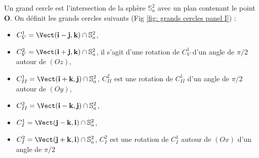 Un grand cercle est l'intersection de la sphère $\mathbb{S}_a^2$ avec un plan contenant le point $\mathbf{O}$. On définit les grands cercles suivants (Fig \ref{fig: grands cercles panel I}) :

\begin{itemize}
\item $C_V^1 = \Vect(\mathbf{i}-\mathbf{j}, \mathbf{k}) \cap \mathbb{S}_a^2$,
\item $C_V^2 = \Vect(\mathbf{i}+\mathbf{j}, \mathbf{k}) \cap \mathbb{S}_a^2$, il s'agit d'une rotation de $C_V^1$ d'un angle de $\pi/2$ autour de $(Oz)$,
\item $C_{II}^1 = \Vect(\mathbf{i}+\mathbf{k}, \mathbf{j}) \cap \mathbb{S}_a^2$, $C_{II}^2$ est une rotation de $C_{II}^1$ d'un angle de $\pi/2$ autour de $(Oy)$,
\item $C_{II}^2 = \Vect(\mathbf{i}-\mathbf{k}, \mathbf{j}) \cap \mathbb{S}_a^2$,
\item $C_I^1=\Vect(\mathbf{j}-\mathbf{k},\mathbf{i}) \cap \mathbb{S}_a^2$,
\item $C_I^2=\Vect(\mathbf{j}+\mathbf{k},\mathbf{i}) \cap \mathbb{S}_a^2$, $C_I^2$ est une rotation de $C_I^1$ autour de $(Ox)$ d'un angle de $\pi/2$
\end{itemize}

